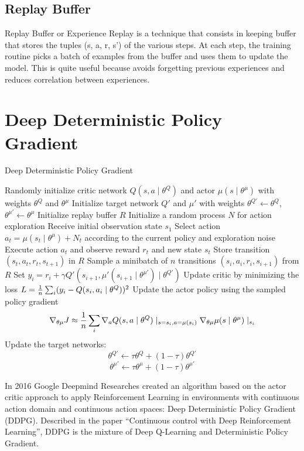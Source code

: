 \documentclass[Lau,oneside,noexaminfo]{sapthesis} %
\begin{document}
\section{Replay Buffer}
Replay Buffer or Experience Replay is a technique that consists in keeping buffer that stores the tuples (s, a, r, s’) of the various steps. \newline
At each step, the training routine picks a batch of examples from the buffer and uses them to update the model. This is quite useful because avoids forgetting previous experiences and reduces correlation between experiences.


\chapter{Deep Deterministic Policy Gradient}
\label{DDPG}
\begin{algorithm}[H]
    \caption{Deep Deterministic Policy Gradient}
\begin{algorithmic}[0]
\STATE Randomly initialize critic network $Q(s,a\mid\theta^Q)$ and actor $\mu(s\mid\theta^\mu)$ with weights $\theta^Q$ and $\theta^\mu$
\STATE Initialize target network $Q'$ and $\mu'$ with weights $\theta^{Q'} \gets \theta^{Q}$, $\theta^{\mu'} \gets \theta^{\mu}$
\STATE Initialize replay buffer $R$
    \STATE Initialize a random process $N$ for action exploration
    \STATE Receive initial observation state $s_1$
        \STATE Select action $a_t=\mu(s_t \mid \theta^\mu) + N_t$ according to the current policy and exploration noise
       	\STATE Execute action $a_t$ and observe reward $r_t$ and new state $s_t$
        \STATE Store transition $(s_t, a_t, r_t, s_{t+1})$ in $R$
        \STATE Sample a minibatch of $n$ transitions $(s_i, a_i, r_i, s_{i+1})$ from $R$
        \STATE Set $y_i = r_i + \gamma Q'(s_{i+1}, \mu'(s_{i+1} \mid \theta^{\mu'})\mid \theta^{Q'})$
        \STATE Update critic by minimizing the loss $L={1 \over n} \sum_i (y_i - Q(s_i, a_i \mid \theta^Q))^2$
        \STATE Update the actor policy using the sampled policy gradient $$ \nabla_{\theta \mu}J \approx {1 \over n} \sum_i \nabla_a Q(s,a \mid \theta^Q) \mid_{s=s_i, a=\mu(s_i)} \nabla_{\theta \mu} \mu(s \mid \theta^\mu) \mid_{s_i}$$
        \STATE Update the target networks: $$\theta^{Q'} \gets \tau \theta^{Q} + (1-\tau)\theta^{Q'}$$ $$\theta^{\mu'} \gets \tau \theta^{\mu} + (1-\tau)\theta^{\mu'}$$
    \ENDFOR
\ENDFOR
\end{algorithmic}
\end{algorithm}
In 2016 Google Deepmind Researches created an algorithm based on the actor critic approach to apply Reinforcement Learning in environments with continuous action domain and continuous action spaces: Deep Deterministic Policy Gradient (DDPG).\newline
Described in the paper “Continuous control with Deep Reinforcement Learning”, DDPG is the mixture of Deep Q-Learning and Deterministic Policy Gradient.\cite{DDPG}
\end{document}
